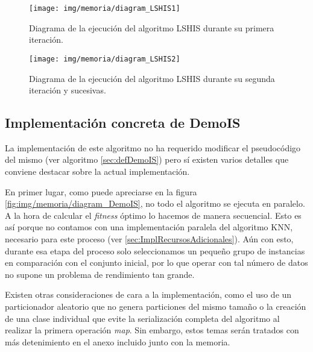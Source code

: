 	\begin{figure}[!h]
		\centering
		\texttt{[image: img/memoria/diagram\_LSHIS1]}
		\caption{Diagrama de la ejecución del algoritmo LSHIS durante su primera iteración.}\label{fig:img/memoria/diagram_LSHIS1}
	\end{figure}
	\FloatBarrier
	
		\begin{figure}[!h]
		\centering
		\texttt{[image: img/memoria/diagram\_LSHIS2]}
		\caption{Diagrama de la ejecución del algoritmo LSHIS durante su segunda iteración y sucesivas.}\label{fig:img/memoria/diagram_LSHIS2}
	\end{figure}
	\FloatBarrier



\subsection{Implementación concreta de DemoIS}

La implementación de este algoritmo no ha requerido modificar el pseudocódigo del mismo (ver algoritmo \ref{sec:defDemoIS}) pero sí existen varios detalles que conviene destacar sobre la actual implementación.

En primer lugar, como puede apreciarse en la figura \ref{fig:img/memoria/diagram_DemoIS}, no todo el algoritmo se ejecuta en paralelo. A la hora de calcular el \textit{fitness} óptimo lo hacemos de manera secuencial. Esto es así porque no contamos con una implementación paralela del algoritmo KNN, necesario para este proceso (ver \ref{sec:ImplRecursosAdicionales}). Aún con esto, durante esa etapa del proceso solo seleccionamos un pequeño grupo de instancias en comparación con el conjunto inicial, por lo que operar con tal número de datos no supone un problema de rendimiento tan grande.

Existen otras consideraciones de cara a la implementación, como el uso de un particionador aleatorio que no genera particiones del mismo tamaño o la creación de una clase individual que evite la serialización completa del algoritmo al realizar la primera operación \textit{map}. Sin embargo, estos temas serán tratados con más detenimiento en el anexo incluido junto con la memoria.


